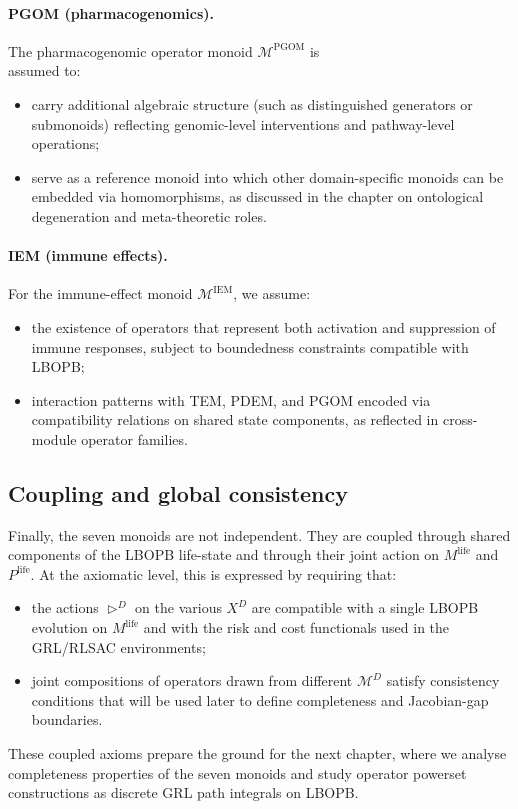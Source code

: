 \documentclass[11pt]{book}
\theoremstyle{plain}
\theoremstyle{definition}
\theoremstyle{remark}
\begin{document}
\paragraph{PGOM (pharmacogenomics).}
The pharmacogenomic operator monoid $\mathcal{M}^{\mathrm{PGOM}}$ is
\\assumed to:
\begin{itemize}
  \item carry additional algebraic structure (such as distinguished
        generators or submonoids) reflecting genomic-level interventions
        and pathway-level operations;
  \item serve as a reference monoid into which other domain-specific
        monoids can be embedded via homomorphisms, as discussed in the
        chapter on ontological degeneration and meta-theoretic roles.
\end{itemize}

\paragraph{IEM (immune effects).}
For the immune-effect monoid $\mathcal{M}^{\mathrm{IEM}}$, we assume:
\begin{itemize}
  \item the existence of operators that represent both activation and
        suppression of immune responses, subject to boundedness
        constraints compatible with LBOPB;
  \item interaction patterns with TEM, PDEM, and PGOM encoded via
        compatibility relations on shared state components, as reflected
        in cross-module operator families.
\end{itemize}

\subsection*{Coupling and global consistency}

Finally, the seven monoids are not independent. They are coupled
through shared components of the LBOPB life-state and through their
joint action on $M^{\mathrm{life}}$ and $P^{\mathrm{life}}$. At the
axiomatic level, this is expressed by requiring that:
\begin{itemize}
  \item the actions $\triangleright^{D}$ on the various $X^{D}$ are
        compatible with a single LBOPB evolution on $M^{\mathrm{life}}$
        and with the risk and cost functionals used in the GRL/RLSAC
        environments;
  \item joint compositions of operators drawn from different
        $\mathcal{M}^{D}$ satisfy consistency conditions that will be
        used later to define completeness and Jacobian-gap boundaries.
\end{itemize}
These coupled axioms prepare the ground for the next chapter, where
we analyse completeness properties of the seven monoids and study
operator powerset constructions as discrete GRL path integrals on
LBOPB.
\end{document}

